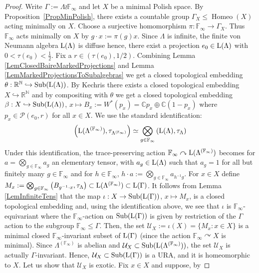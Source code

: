 \documentclass[12pt]{amsart} %
\theoremstyle{plain}
\theoremstyle{definition}
\newcommand{\C}{\mathbb{C}}
\DeclareMathOperator{\Sub}{Sub}
\DeclareMathOperator{\Homeo}{Homeo}
\begin{document}
\begin{proof}
Write $\Gamma:=\Lambda\wr \mathbb F_\infty$ and let \(X\) be a minimal Polish space. By Proposition~\ref{PropMinPolish}, there exists
a countable group $\Gamma_X\leq \Homeo(X)$ acting minimally on $X$. Choose a surjective homomorphism $\pi:\mathbb F_\infty\to \Gamma_X$. Thus \(\mathbb F_\infty\) acts minimally on \(X\) by $g\cdot x:=\pi(g)x$.
\medskip
\noindent Since \(\Lambda\) is infinite, the finite von Neumann algebra \({\rm L}(\Lambda)\) is
diffuse hence,  there exist a projection \(e_0\in{\rm L}(\Lambda)\) with $0<\tau(e_0)<\frac12$. Fix a $r\in(\tau(e_0),1/2)$. Combining Lemma \ref{LemClosedBaireMarkedProjections} and Lemma \ref{LemMarkedProjectionsToSubalgebras} we get a closed topological embedding $\theta:\mathbb R^{\mathbb N}\hookrightarrow \Sub({\rm L}(\Lambda))$. By Kechris \cite[Theorem 4.17]{kechrisClassicaldescriptiveset1995} there exists a closed topological embedding $X\hookrightarrow \mathbb R^{\mathbb N}$ and by compositing with $\theta$ we get a closed topological embedding $\beta:X\hookrightarrow \Sub({\rm L}(\Lambda))$, $x\mapsto B_x:=W^*(p_x)=\C p_x\oplus\C(1-p_x)$ where $p_x\in\mathcal{P}(e_0,r)$ for all $x\in X$.
\medskip
\noindent We use the standard identification:
$$\left({\rm L}(\Lambda^{(\mathbb{F}_\infty)}),\tau_{\Lambda^{(\mathbb{F}_\infty)}}\right)\simeq\bigotimes_{g\in\mathbb{F}_\infty}\left({\rm L}(\Lambda),\tau_\Lambda\right)$$
Under this identification, the trace-preserving action $\mathbb{F}_\infty\curvearrowright {\rm L}(\Lambda^{(\mathbb{F}_\infty)})$ becomes for $a=\bigotimes_{g\in\mathbb{F}_\infty} a_g$ an elementary tensor, with $a_g\in{\rm L}(\Lambda)$ such that $a_g=1$ for all but finitely many $g\in\mathbb{F}_\infty$ and for $h\in \mathbb{F}_\infty$, $h\cdot a:=\bigotimes_{g\in\mathbb{F}_\infty} a_{h^{-1}g}$.
For $x\in X$ define $M_x:=\bigotimes_{g\in\mathbb{F}_\infty}\left(B_{g^{-1}\cdot x},\tau_\Lambda\right)\subset{\rm L}(\Lambda^{(\mathbb{F}_\infty)})\subset {\rm L}(\Gamma)$. It follows from Lemma \ref{LemInfiniteTens} that the map $\iota:X\to{\rm Sub}({\rm L}(\Gamma))$, $x\mapsto M_x$, is a closed topological embedding and, using the identification above, we see that $\iota$ is $\mathbb{F}_\infty$-equivariant  where the $\mathbb{F}_\infty$-action on ${\rm Sub}({\rm L}(\Gamma))$ is given by restriction of the $\Gamma$ action to the subgroup $\mathbb{F}_\infty\leq\Gamma$. Then, the set $\mathcal{U}_X:=\iota(X)=\{M_x:x\in X\}$ is a minimal closed $\mathbb{F}_\infty$-invariant subset of ${\rm L}(\Gamma)$ (since the action $\mathbb{F}_\infty\curvearrowright X$ is minimal). Since $\Lambda^{(\mathbb{F}_\infty)}$ is abelian and $\mathcal{U}_X\subset \Sub({\rm L}(\Lambda^{(\mathbb{F}_\infty)}))$, the set $\mathcal{U}_X$ is actually $\Gamma$-invariant. Hence, $\mathcal{U}_X\subset \Sub({\rm L}(\Gamma))$ is a URA, and it is homeomorphic to $X$. Let us show that $\mathcal{U}_X$ is exotic. Fix \(x\in X\) and suppose, by

\end{proof}
\end{document}

